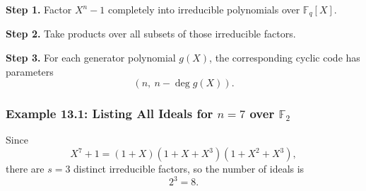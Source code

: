 \documentclass[11pt,oneside]{book}
\theoremstyle{plain}
\theoremstyle{definition}
\theoremstyle{remark}
\begin{document}
\textbf{Step 1.} Factor \(X^n-1\) completely into irreducible
polynomials over \(\mathbb{F}_q[X]\).

\textbf{Step 2.} Take products over all subsets of those irreducible
factors.

\textbf{Step 3.} For each generator polynomial \(g(X)\), the
corresponding cyclic code has parameters \[(n,\ n-\deg g(X)).\]

\subsubsection{\texorpdfstring{Example 13.1: Listing All Ideals for
\(n=7\) over
\(\mathbb{F}_2\)}{Example 13.1: Listing All Ideals for n=7 over \textbackslash mathbb\{F\}\_2}}\label{example-13.1-listing-all-ideals-for-n7-over-mathbbf_2}

Since \[X^7+1=(1+X)(1+X+X^3)(1+X^2+X^3),\] there are \(s=3\) distinct
irreducible factors, so the number of ideals is \[2^3=8.\]
\end{document}
